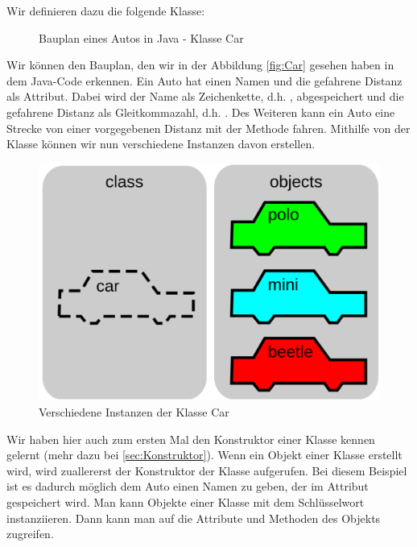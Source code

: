 \documentclass{tuda-pub}
\begin{document}
  Wir definieren dazu die folgende Klasse:

  \begin{figure}[h]
    
    \caption{Bauplan eines Autos in Java - Klasse Car}
    \label{fig:Car_Java}
  \end{figure}

  \clearpage

  Wir können den Bauplan, den wir in der Abbildung \ref{fig:Car} gesehen haben in dem Java-Code
  erkennen. Ein Auto hat einen Namen und die gefahrene Distanz als Attribut. Dabei wird der Name
  als Zeichenkette, d.h. , abgespeichert und die gefahrene Distanz als
  Gleitkommazahl, d.h. . Des Weiteren kann ein Auto eine Strecke von einer
  vorgegebenen Distanz mit der Methode  fahren. Mithilfe von der Klasse
   können wir nun verschiedene Instanzen davon erstellen.

  \begin{figure}[h]
    \centering
    \includegraphics[width=.55\linewidth]{Car_Instances.png}
    \caption{Verschiedene Instanzen der Klasse Car}
    \label{fig:Car_Instances}
  \end{figure}

  \begin{note}[title=Information:]
    Wir haben hier auch zum ersten Mal den Konstruktor einer Klasse kennen gelernt (mehr dazu bei
    \ref{sec:Konstruktor}). Wenn ein Objekt einer Klasse erstellt wird, wird zuallererst der
    Konstruktor der Klasse aufgerufen. Bei diesem Beispiel ist es dadurch möglich dem Auto einen
    Namen zu geben, der im Attribut  gespeichert wird. Man kann Objekte einer
    Klasse mit dem Schlüsselwort  instanziieren. Dann kann man auf die Attribute
    und Methoden des Objekts zugreifen.
  \end{note}

  \clearpage
\end{document}
